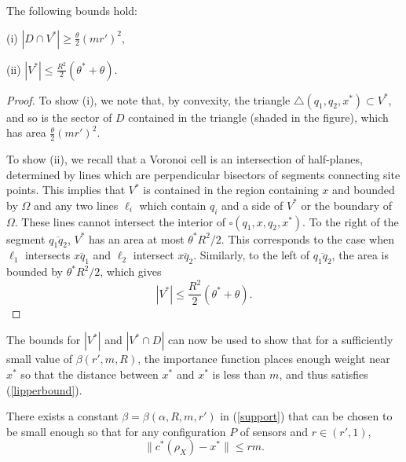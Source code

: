 \documentclass[onefignum,onetabnum]{siamart171218} %
\begin{document}
\begin{lemma} \label{invthm} The following bounds hold:

\vspace{5pt}

(i) $|D \cap V^*|\ge \frac{\theta}{2}(mr')^2, $

(ii) $|V^*| \le \frac{R^2}{2}(\theta^* +\theta)$. 
\end{lemma}




\begin{proof}  


To show (i), we note that, by convexity, the triangle $\triangle (q_1, q_2, x^*)\subset V^*$, and so is the sector of $D$ contained in the triangle (shaded in the figure), which has area $\frac{\theta}{2}(mr')^2$.  

To show (ii), we recall that a Voronoi cell is an intersection  of half-planes, determined by lines which are perpendicular bisectors of segments connecting site points. This implies that $V^*$ is contained in the region containing $x$ and bounded by $\Omega$ and any two lines $\ell_i$ which contain  $q_i$ and a side of $V^*$ or the boundary of $\Omega$.  These lines cannot intersect the interior of $\square (q_1,x,q_2,x^*)$.  To the right of the segment $\overline{q_1q_2}$, $V^*$ has an area at most $\theta^* R^2/2$. This corresponds to the case when $\ell_1$ intersects $\overline{xq_1}$ and $\ell_2$ intersect $\overline{xq_2}$.  Similarly, to the left of $\overline{q_1q_2}$, the area is bounded by $\theta^* R^2/2$, which gives
\begin{equation}
    |V^*| \le \frac{R^2}{2}(\theta^* +\theta).
\end{equation}

\end{proof}

The bounds for $|V^*|$ and $|V^* \cap D|$ can now be used to show that for a sufficiently small value of $\beta(r',m,R)$, the importance function places enough weight near $x^*$ so that the distance between $x^*$ and $x^*$ is less than $m$, and thus satisfies (\ref{lipperbound}).




\begin{lemma} \label{cormin}
There exists a constant $\beta = \beta(\alpha,R, m, r')$ in (\ref{support}) that can be chosen to be small enough so that for any configuration $P$ of sensors and $r \in (r',1)$,
\begin{equation}
	\|c^*(\rho_X)- x^*\| \le rm.\label{mincond} 
\end{equation} 
\end{lemma}
\end{document}
